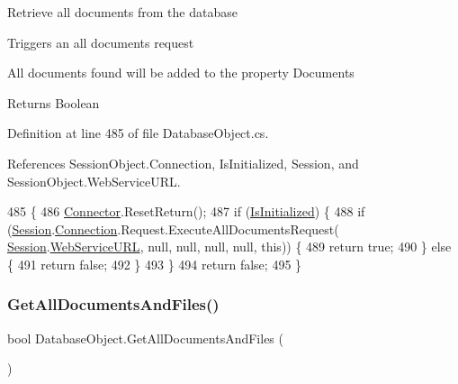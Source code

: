 Retrieve all documents from the database 

Triggers an all documents request

All documents found will be added to the property \textquotesingle{}Documents\textquotesingle{}

\begin{DoxyReturn}{Returns}
Boolean
\end{DoxyReturn}


Definition at line 485 of file Database\+Object.\+cs.



References Session\+Object.\+Connection, Is\+Initialized, Session, and Session\+Object.\+Web\+Service\+U\+RL.


\begin{DoxyCode}
485                                   \{
486         \mbox{\hyperlink{class_connector}{Connector}}.ResetReturn();
487         \textcolor{keywordflow}{if} (\mbox{\hyperlink{class_database_object_a5fe036d32a30eb10d1b3f6a30263f740}{IsInitialized}}) \{
488             \textcolor{keywordflow}{if} (\mbox{\hyperlink{class_database_object_aa8484162b7d2a7c4c9426bca13c64c07}{Session}}.\mbox{\hyperlink{class_session_object_a014bdbf705a753540e19bfb53030c55c}{Connection}}.Request.ExecuteAllDocumentsRequest(
      \mbox{\hyperlink{class_database_object_aa8484162b7d2a7c4c9426bca13c64c07}{Session}}.\mbox{\hyperlink{class_session_object_a697c071c812fbf7ad1166b896fb44c16}{WebServiceURL}}, null, null, null, null, \textcolor{keyword}{this})) \{
489                 \textcolor{keywordflow}{return} \textcolor{keyword}{true};
490             \} \textcolor{keywordflow}{else} \{
491                 \textcolor{keywordflow}{return} \textcolor{keyword}{false};
492             \}
493         \}
494         \textcolor{keywordflow}{return} \textcolor{keyword}{false};
495     \}
\end{DoxyCode}
\mbox{\label{class_database_object_a72239fa2b2a549665e45cdd340cd70a0}} 
\subsubsection{\texorpdfstring{Get\+All\+Documents\+And\+Files()}{GetAllDocumentsAndFiles()}}
{\footnotesize\ttfamily bool Database\+Object.\+Get\+All\+Documents\+And\+Files (\begin{DoxyParamCaption}{ }\end{DoxyParamCaption})}



